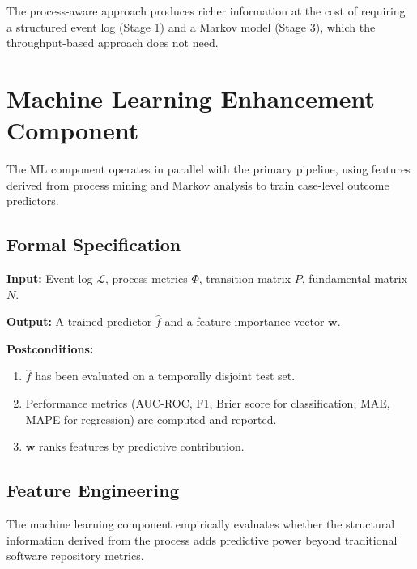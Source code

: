 The process-aware approach produces richer information at the cost of 
requiring a structured event log (Stage 1) and a Markov model (Stage 3), 
which the throughput-based approach does not need.


\section{Machine Learning Enhancement Component}
\label{sec:ml-component}

The ML component operates in parallel with the primary pipeline, using 
features derived from process mining and Markov analysis to train 
case-level outcome predictors.

\subsection{Formal Specification}
\label{sec:ml-formal}

\begin{definition}
\label{def:contract-ml}
\textbf{Input:} Event log $\mathcal{L}$, process metrics $\Phi$, 
transition matrix $P$, fundamental matrix $N$.

\textbf{Output:} A trained predictor $\hat{f}$ and a feature importance 
vector $\mathbf{w}$.

\textbf{Postconditions:}
\begin{enumerate}
    \item $\hat{f}$ has been evaluated on a temporally disjoint test set.
    \item Performance metrics (AUC-ROC, F1, Brier score for 
    classification; MAE, MAPE for regression) are computed and reported.
    \item $\mathbf{w}$ ranks features by predictive contribution.
\end{enumerate}
\end{definition}


\subsection{Feature Engineering}
\label{sec:ml-feature-eng}
The machine learning component empirically evaluates whether the structural information derived from the process adds predictive power beyond traditional software repository metrics.

